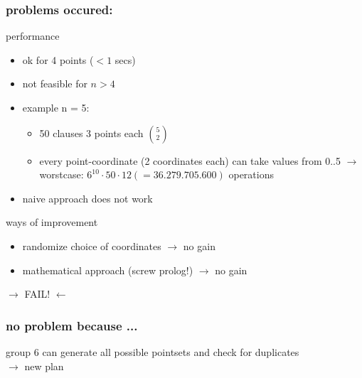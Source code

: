 \documentclass{beamer}
\begin{document}
\begin{frame}
\frametitle{problems occured:}
performance
\begin{itemize}
\item ok for 4 points ($<1$ secs)
\item not feasible for $n > 4$
\item example n = 5:
\begin{itemize}
  \item 50 clauses 3 points each $\binom{5}{2}$
  \item every point-coordinate (2 coordinates each) can take values from 0..5 \newline $\rightarrow$ worstcase: $6^{10} \cdot 50 \cdot 12 (=36.279.705.600)$ operations
\end{itemize}
\item naive approach does not work
\end{itemize}
ways of improvement
\begin{itemize}
\item randomize choice of coordinates $\rightarrow$ no gain
\item mathematical approach (screw prolog!) $\rightarrow$ no gain
\end{itemize}
\pause
\begin{center}
\huge{ $\rightarrow$ FAIL! $\leftarrow$}
\end{center}
\end{frame}

\begin{frame}
\frametitle{no problem because ...}
group 6 can generate all possible pointsets and check for duplicates\\
$\rightarrow$ new plan
\end{frame}

\end{document}
